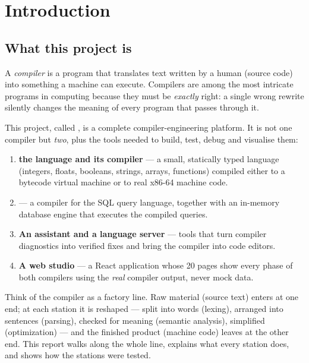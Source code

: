 \chapter{Introduction}
\label{ch:intro}

\section{What this project is}
A \emph{compiler} is a program that translates text written by a human (source code) into something a machine can execute. Compilers are among the most intricate programs in computing because they must be \emph{exactly} right: a single wrong rewrite silently changes the meaning of every program that passes through it.

This project, called \nova{}, is a complete compiler-engineering platform. It is not one compiler but \emph{two}, plus the tools needed to build, test, debug and visualise them:

\begin{enumerate}
  \item \textbf{\nova{} the language and its compiler} --- a small, statically typed language (integers, floats, booleans, strings, arrays, functions) compiled either to a bytecode virtual machine or to real x86-64 machine code.
  \item \textbf{\novasql{}} --- a compiler for the SQL query language, together with an in-memory database engine that executes the compiled queries.
  \item \textbf{An assistant and a language server} --- tools that turn compiler diagnostics into verified fixes and bring the compiler into code editors.
  \item \textbf{A web studio} --- a React application whose 20 pages show every phase of both compilers using the \emph{real} compiler output, never mock data.
\end{enumerate}

\begin{plain}
Think of the compiler as a factory line. Raw material (source text) enters at one end; at each station it is reshaped --- split into words (lexing), arranged into sentences (parsing), checked for meaning (semantic analysis), simplified (optimization) --- and the finished product (machine code) leaves at the other end. This report walks along the whole line, explains what every station does, and shows how the stations were tested.
\end{plain}


